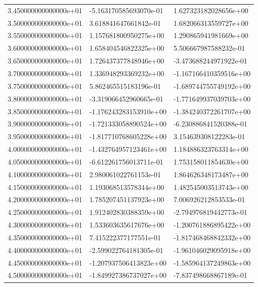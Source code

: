 \documentclass[pdf,color]{UoBnote}
\begin{document}
\begin{table}[H]
{\begin{tabular}{l|l|l}
    3.450000000000000e+01 & -5.163170585693070e-01 & 1.627323182028656e+00  \\
    3.500000000000000e+01 & 3.618841647661842e-01  & 1.682066313559727e+00  \\
    3.550000000000000e+01 & 1.157681800950275e+00  & 1.290865941981669e+00  \\
    3.600000000000000e+01 & 1.658404546822325e+00  & 5.506667987588232e-01  \\
    3.650000000000000e+01 & 1.726437377848946e+00  & -3.473688244971922e-01 \\
    3.700000000000000e+01 & 1.336948293369232e+00  & -1.167166410359516e+00 \\
    3.750000000000000e+01 & 5.862465515183196e-01  & -1.689744755749192e+00 \\
    3.800000000000000e+01 & -3.319066452960665e-01 & -1.771649937039703e+00 \\
    3.850000000000000e+01 & -1.176243283153910e+00 & -1.384240372261707e+00 \\
    3.900000000000000e+01 & -1.721333058890524e+00 & -6.230886841520388e-01 \\
    3.950000000000000e+01 & -1.817710768605228e+00 & 3.154639308122283e-01  \\
    4.000000000000000e+01 & -1.432764957123461e+00 & 1.184886323763314e+00  \\
    4.050000000000000e+01 & -6.612261756013711e-01 & 1.753158011854630e+00  \\
    4.100000000000000e+01 & 2.980061022761153e-01  & 1.864626348173487e+00  \\
    4.150000000000000e+01 & 1.193068513578344e+00  & 1.482545003513743e+00  \\
    4.200000000000000e+01 & 1.785207451137923e+00  & 7.006926212853533e-01  \\
    4.250000000000000e+01 & 1.912402830388359e+00  & -2.794976819442773e-01 \\
    4.300000000000000e+01 & 1.533603635617676e+00  & -1.200761886895422e+00 \\
    4.350000000000000e+01 & 7.415222377177551e-01  & -1.817468468842332e+00 \\
    4.400000000000000e+01 & -2.599022764181305e-01 & -1.961046029095918e+00 \\
    4.450000000000000e+01 & -1.207937506413823e+00 & -1.585964137249863e+00 \\
    4.500000000000000e+01 & -1.849927386737027e+00 & -7.837498668867189e-01 \\

\end{tabular}}
\end{table}
\end{document}
